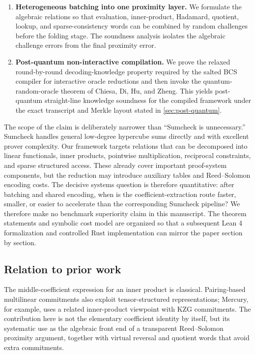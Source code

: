 \begin{enumerate}[leftmargin=*,itemsep=0.5em]
  \item \textbf{Heterogeneous batching into one proximity layer.}
  We formulate the algebraic relations so that evaluation, inner-product, Hadamard, quotient, lookup, and sparse-consistency words can be combined by random challenges before the folding stage.  The soundness analysis isolates the algebraic challenge errors from the final proximity error.

  \item \textbf{Post-quantum non-interactive compilation.}
  We prove the relaxed round-by-round decoding-knowledge property required by the salted BCS compiler for interactive oracle reductions and then invoke the quantum-random-oracle theorem of Chiesa, Di, Hu, and Zheng.  This yields post-quantum straight-line knowledge soundness for the compiled framework under the exact transcript and Merkle layout stated in \cref{sec:post-quantum}.
\end{enumerate}

The scope of the claim is deliberately narrower than ``Sumcheck is unnecessary.''  Sumcheck handles general low-degree hypercube sums directly and with excellent prover complexity.  Our framework targets relations that can be decomposed into linear functionals, inner products, pointwise multiplication, reciprocal constraints, and sparse structured access.  These already cover important proof-system components, but the reduction may introduce auxiliary tables and Reed--Solomon encoding costs.  The decisive systems question is therefore quantitative: after batching and shared encoding, when is the coefficient-extraction route faster, smaller, or easier to accelerate than the corresponding Sumcheck pipeline?  We therefore make no benchmark superiority claim in this manuscript.  The theorem statements and symbolic cost model are organized so that a subsequent Lean 4 formalization and controlled Rust implementation can mirror the paper section by section.

\subsection{Relation to prior work}

The middle-coefficient expression for an inner product is classical.  Pairing-based multilinear commitments also exploit tensor-structured representations; Mercury, for example, uses a related inner-product viewpoint with KZG commitments.  The contribution here is not the elementary coefficient identity by itself, but its systematic use as the algebraic front end of a transparent Reed--Solomon proximity argument, together with virtual reversal and quotient words that avoid extra commitments.

